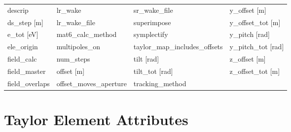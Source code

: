 \begin{tabular}{llll}
descrip                          & lr_wake                          & sr_wake_file                     & y_offset [m]                     \\
ds_step [m]                      & lr_wake_file                     & superimpose                      & y_offset_tot [m]                 \\
e_tot [eV]                       & mat6_calc_method                 & symplectify                      & y_pitch [rad]                    \\
ele_origin                       & multipoles_on                    & taylor_map_includes_offsets      & y_pitch_tot [rad]                \\
field_calc                       & num_steps                        & tilt [rad]                       & z_offset [m]                     \\
field_master                     & offset [m]                       & tilt_tot [rad]                   & z_offset_tot [m]                 \\
field_overlaps                   & offset_moves_aperture            & tracking_method                  &                                  \\
 \bottomrule
 \end{tabular}
 \vfill
 
 \section{Taylor Element Attributes}
 \label{s:list.taylor}
 
